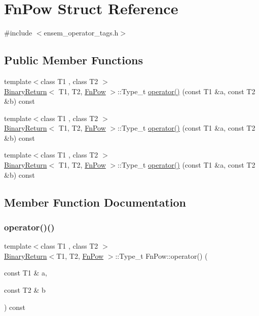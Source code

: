 \hypertarget{structFnPow}{}\section{Fn\+Pow Struct Reference}
\label{structFnPow}


{\ttfamily \#include $<$ensem\+\_\+operator\+\_\+tags.\+h$>$}

\subsection*{Public Member Functions}
\begin{DoxyCompactItemize}
\item 
{\footnotesize template$<$class T1 , class T2 $>$ }\\\mbox{\hyperlink{structBinaryReturn}{Binary\+Return}}$<$ T1, T2, \mbox{\hyperlink{structFnPow}{Fn\+Pow}} $>$\+::Type\+\_\+t \mbox{\hyperlink{structFnPow_ae45f2e7b97a332060329770959c524c7}{operator()}} (const T1 \&a, const T2 \&b) const
\item 
{\footnotesize template$<$class T1 , class T2 $>$ }\\\mbox{\hyperlink{structBinaryReturn}{Binary\+Return}}$<$ T1, T2, \mbox{\hyperlink{structFnPow}{Fn\+Pow}} $>$\+::Type\+\_\+t \mbox{\hyperlink{structFnPow_ae45f2e7b97a332060329770959c524c7}{operator()}} (const T1 \&a, const T2 \&b) const
\item 
{\footnotesize template$<$class T1 , class T2 $>$ }\\\mbox{\hyperlink{structBinaryReturn}{Binary\+Return}}$<$ T1, T2, \mbox{\hyperlink{structFnPow}{Fn\+Pow}} $>$\+::Type\+\_\+t \mbox{\hyperlink{structFnPow_ae45f2e7b97a332060329770959c524c7}{operator()}} (const T1 \&a, const T2 \&b) const
\end{DoxyCompactItemize}


\subsection{Member Function Documentation}
\mbox{\label{structFnPow_ae45f2e7b97a332060329770959c524c7}} 
\subsubsection{\texorpdfstring{operator()()}{operator()()}\hspace{0.1cm}{\footnotesize\ttfamily [1/3]}}
{\footnotesize\ttfamily template$<$class T1 , class T2 $>$ \\
\mbox{\hyperlink{structBinaryReturn}{Binary\+Return}}$<$T1, T2, \mbox{\hyperlink{structFnPow}{Fn\+Pow}} $>$\+::Type\+\_\+t Fn\+Pow\+::operator() (\begin{DoxyParamCaption}\item[{const T1 \&}]{a,  }\item[{const T2 \&}]{b }\end{DoxyParamCaption}) const\hspace{0.3cm}{\ttfamily [inline]}}

